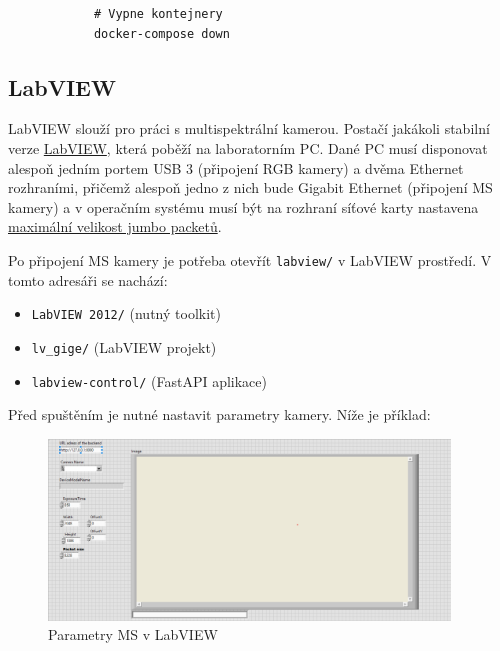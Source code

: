 \documentclass[12pt]{article}
\begin{document}
\begin{teamwork}
\begin{verbatim}
            # Vypne kontejnery
            docker-compose down
        \end{verbatim}

        \subsection{LabVIEW}\label{subsec:labview}

        LabVIEW slouží pro práci s multispektrální kamerou.
        Postačí jakákoli stabilní verze \href{https://www.ni.com/en/support/downloads/software-products/download.labview.html#559067}{LabVIEW}, která poběží na laboratorním PC\@.
        Dané PC musí disponovat alespoň jedním portem USB 3 (připojení RGB kamery) a dvěma Ethernet rozhraními, přičemž alespoň jedno z nich bude Gigabit Ethernet (připojení MS kamery) a v operačním systému musí být
        na rozhraní síťové karty nastavena \href{https://docs.adaptive-vision.com/4.7/studio/technical_issues/gigevision/EnablingJumboPackets.html}{maximální velikost jumbo packetů}.

        Po připojení MS kamery je potřeba otevřít \texttt{labview/} v LabVIEW prostředí.
        V tomto adresáři se nachází:
        \begin{itemize}
            \item \texttt{LabVIEW 2012/} (nutný toolkit)
            \item \texttt{lv\_gige/} (LabVIEW projekt)
            \item \texttt{labview-control/} (FastAPI aplikace)
        \end{itemize}

        Před spuštěním je nutné nastavit parametry kamery.
        Níže je příklad:

        \begin{figure}[hbt!]
            \centering
            \includegraphics[width=0.95\textwidth]{../../img/labview-hyperspectral-cam-settings}
            \caption{Parametry MS v LabVIEW}
            \label{fig:params_ms_labview}
        \end{figure}


\end{teamwork}
\end{document}

